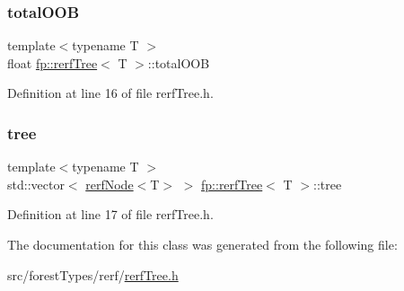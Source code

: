 \mbox{\label{classfp_1_1rerfTree_aaac789925d8100bf33cdbb440df8e593}} 
\subsubsection{\texorpdfstring{total\+O\+OB}{totalOOB}}
{\footnotesize\ttfamily template$<$typename T $>$ \\
float \hyperlink{classfp_1_1rerfTree}{fp\+::rerf\+Tree}$<$ T $>$\+::total\+O\+OB\hspace{0.3cm}{\ttfamily [protected]}}



Definition at line 16 of file rerf\+Tree.\+h.

\mbox{\label{classfp_1_1rerfTree_afc9392154cb4d1dde02e26a9ec31e356}} 
\subsubsection{\texorpdfstring{tree}{tree}}
{\footnotesize\ttfamily template$<$typename T $>$ \\
std\+::vector$<$ \hyperlink{classrerfNode}{rerf\+Node}$<$T$>$ $>$ \hyperlink{classfp_1_1rerfTree}{fp\+::rerf\+Tree}$<$ T $>$\+::tree\hspace{0.3cm}{\ttfamily [protected]}}



Definition at line 17 of file rerf\+Tree.\+h.



The documentation for this class was generated from the following file\+:\begin{DoxyCompactItemize}
\item 
src/forest\+Types/rerf/\hyperlink{rerfTree_8h}{rerf\+Tree.\+h}\end{DoxyCompactItemize}
